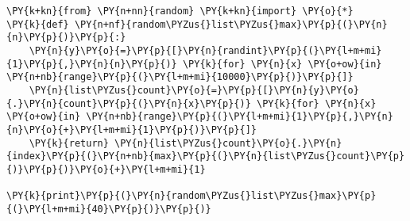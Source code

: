 \begin{Verbatim}[commandchars=\\\{\}]
\PY{k+kn}{from} \PY{n+nn}{random} \PY{k+kn}{import} \PY{o}{*}
\PY{k}{def} \PY{n+nf}{random\PYZus{}list\PYZus{}max}\PY{p}{(}\PY{n}{n}\PY{p}{)}\PY{p}{:}
    \PY{n}{y}\PY{o}{=}\PY{p}{[}\PY{n}{randint}\PY{p}{(}\PY{l+m+mi}{1}\PY{p}{,}\PY{n}{n}\PY{p}{)} \PY{k}{for} \PY{n}{x} \PY{o+ow}{in} \PY{n+nb}{range}\PY{p}{(}\PY{l+m+mi}{10000}\PY{p}{)}\PY{p}{]}
    \PY{n}{list\PYZus{}count}\PY{o}{=}\PY{p}{[}\PY{n}{y}\PY{o}{.}\PY{n}{count}\PY{p}{(}\PY{n}{x}\PY{p}{)} \PY{k}{for} \PY{n}{x} \PY{o+ow}{in} \PY{n+nb}{range}\PY{p}{(}\PY{l+m+mi}{1}\PY{p}{,}\PY{n}{n}\PY{o}{+}\PY{l+m+mi}{1}\PY{p}{)}\PY{p}{]}
    \PY{k}{return} \PY{n}{list\PYZus{}count}\PY{o}{.}\PY{n}{index}\PY{p}{(}\PY{n+nb}{max}\PY{p}{(}\PY{n}{list\PYZus{}count}\PY{p}{)}\PY{p}{)}\PY{o}{+}\PY{l+m+mi}{1}

\PY{k}{print}\PY{p}{(}\PY{n}{random\PYZus{}list\PYZus{}max}\PY{p}{(}\PY{l+m+mi}{40}\PY{p}{)}\PY{p}{)}
\end{Verbatim}
